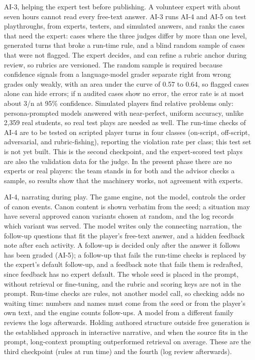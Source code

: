 AI-3, helping the expert test before publishing. A volunteer expert with about seven hours cannot read every free-text answer. AI-3 runs AI-4 and AI-5 on test playthroughs, from experts, testers, and simulated answers, and ranks the cases that need the expert: cases where the three judges differ by more than one level, generated turns that broke a run-time rule, and a blind random sample of cases that were not flagged. The expert decides, and can refine a rubric anchor during review, so rubrics are versioned. The random sample is required because confidence signals from a language-\allowbreak{}model grader separate right from wrong grades only weakly, with an area under the curve of 0.57 to 0.64\cite{r117}, so flagged cases alone can hide errors; if n audited cases show no error, the error rate is at most about 3/n at 95\% confidence\cite{r118}. Simulated players find relative problems only: persona-\allowbreak{}prompted models answered with near-\allowbreak{}perfect, uniform accuracy, unlike 2,359 real students\cite{r119}, so real test plays are needed as well. The run-time checks of AI-4 are to be tested on scripted player turns in four classes (on-script, off-script, adversarial, and rubric-\allowbreak{}fishing), reporting the violation rate per class; this test set is not yet built. This is the second checkpoint, and the expert-\allowbreak{}scored test plays are also the validation data for the judge. In the present phase there are no experts or real players: the team stands in for both and the advisor checks a sample, so results show that the machinery works, not agreement with experts.

AI-4, narrating during play. The game engine, not the model, controls the order of canon events. Canon content is shown verbatim from the seed; a situation may have several approved canon variants chosen at random, and the log records which variant was served. The model writes only the connecting narration, the follow-up questions that fit the player's free-text answer, and a hidden feedback note after each activity. A follow-up is decided only after the answer it follows has been graded (AI-5); a follow-up that fails the run-time checks is replaced by the expert's default follow-up, and a feedback note that fails them is redrafted, since feedback has no expert default. The whole seed is placed in the prompt, without retrieval or fine-\allowbreak{}tuning, and the rubric and scoring keys are not in the prompt. Run-time checks are rules, not another model call, so checking adds no waiting time: numbers and names must come from the seed or from the player's own text, and the engine counts follow-ups. A model from a different family reviews the logs afterwards. Holding authored structure outside free generation is the established approach in interactive narrative\cite{r120}, and when the source fits in the prompt, long-\allowbreak{}context prompting outperformed retrieval on average\cite{r121}. These are the third checkpoint (rules at run time) and the fourth (log review afterwards).

